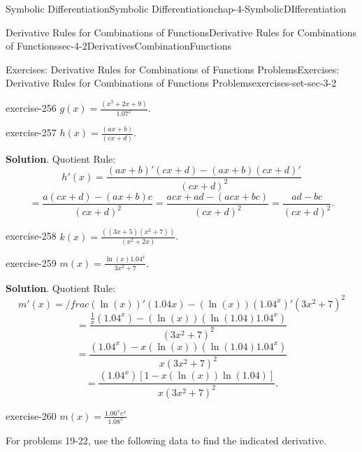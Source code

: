 \documentclass[oneside,10pt,]{book}
\numberwithin{equation}{section}
\begin{document}
\begin{chapterptx}{Symbolic Differentiation}{}{Symbolic Differentiation}{}{}{chap-4-SymbolicDIfferentiation}
\begin{sectionptx}{Derivative Rules for Combinations of Functions}{}{Derivative Rules for Combinations of Functions}{}{}{sec-4-2DerivativesCombinationFunctions}
\begin{exercises-subsection}{Exercises: Derivative Rules for Combinations of Functions Problems}{}{Exercises: Derivative Rules for Combinations of Functions Problems}{}{}{exercises-set-sec-3-2}
\begin{divisionexercise}{14}{}{}{exercise-256}
\hypertarget{p-1590}{}%
\(g(x)=\frac{(x^3+2x+9)}{1.07^x}\).%
\end{divisionexercise}%
\begin{divisionexercise}{15}{}{}{exercise-257}%
\hypertarget{p-1591}{}%
\(h(x)=\frac{(a x+b)}{(c x+d)}\).%
\par\smallskip%
\noindent\textbf{Solution}.\hypertarget{solution-128}{}\quad%
\hypertarget{p-1592}{}%
Quotient Rule:%
%
\begin{equation*}
h'(x)=\frac{(a x+b)' (c x+d)-(a x+b) (c x+d)'}{(c x+d)^2}
\end{equation*}
%
\begin{equation*}
= \frac{a(c x+d)-(a x+b)c}{(c x+d)^2} =\frac{acx+ad-(ac x+bc)}{(c x+d)^2}   =\frac{ad-bc}{(c x+d)^2}. 
\end{equation*}
\end{divisionexercise}%
\begin{divisionexercise}{16}{}{}{exercise-258}%
\hypertarget{p-1593}{}%
\(k(x)=\frac{((3x+5)(x^2+7))}{(x^2+2x)}\).%
\end{divisionexercise}%
\begin{divisionexercise}{17}{}{}{exercise-259}%
\hypertarget{p-1594}{}%
\(m(x)=\frac{\ln(x)1.04^x}{3x^2+7}\).%
\par\smallskip%
\noindent\textbf{Solution}.\hypertarget{solution-129}{}\quad%
\hypertarget{p-1595}{}%
Quotient Rule:%
%
\begin{equation*}
m'(x)=/frac{(\ln(x))' (1.04x )-(\ln(x) ) (1.04^x)'}{(3x^2+7)^2}
\end{equation*}
%
\begin{equation*}
=\frac{\frac{1}{x}(1.04^x )-(\ln(x) )(\ln(1.04) 1.04^x)}{(3x^2+7)^2} 
\end{equation*}
%
\begin{equation*}
=\frac{(1.04^x )-x(\ln(x) )(\ln(1.04) 1.04^x)}{x(3x^2+7)^2 }
\end{equation*}
%
\begin{equation*}
=\frac{(1.04^x )[1-x(\ln(x) )  \ln(1.04) ]}{x(3x^2+7)^2 }.
\end{equation*}
\end{divisionexercise}%
\begin{divisionexercise}{18}{}{}{exercise-260}%
\hypertarget{p-1596}{}%
\(m(x)=\frac{1.06^x e^x}{1.08^x}\)%
\end{divisionexercise}%
\hypertarget{p-1597}{}%
For problems 19-22, use the following data to find the indicated derivative. \leavevmode%
\begin{sidebyside}{1}{0}{0}{0}%
\begin{sbspanel}{1}%

\end{sbspanel}
\end{sidebyside}
\end{exercises-subsection}
\end{sectionptx}
\end{chapterptx}
\end{document}
